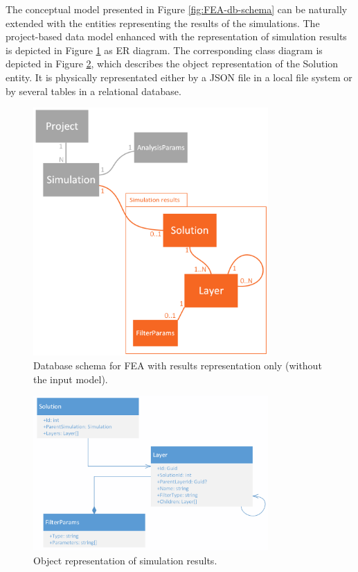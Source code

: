 
The conceptual model presented in Figure \ref{fig:FEA-db-schema} can be naturally extended with the entities representing the results of the simulations. The project-based data model enhanced with the representation of simulation results is depicted in Figure \ref{fig:FEA-db-schema-results} as ER diagram. The corresponding class diagram is depicted in Figure \ref{fig:results-class-diagram}, which describes the object representation of the Solution entity. It is physically representated either by a JSON file in a local file system or by several tables in a relational database.

\begin{figure}[H]
    \centering
    \includegraphics[width=0.8\textwidth]{figures/chapter-data-management/FEA-database-schema-only-results}
    \decoRule
    \caption[Database schema for FEA with results representation only.]{Database schema for FEA with results representation only (without the input model).}
    \label{fig:FEA-db-schema-results}
\end{figure}

\begin{figure}[H]
    \centering
    \includegraphics[width=0.8\textwidth]{figures/chapter-data-management/results-class-diagram}
    \decoRule
    \caption{Object representation of simulation results.}
    \label{fig:results-class-diagram}
\end{figure}

